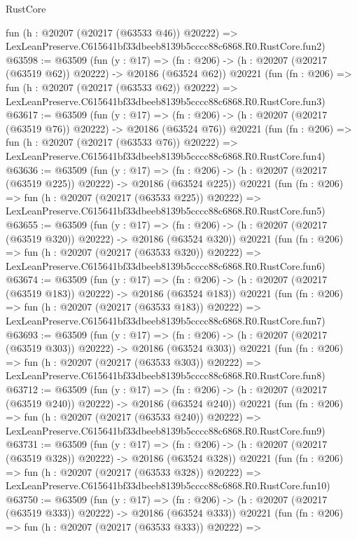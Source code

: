 \begin{lexlean}{RustCore}
\begin{coremodule}
    fun (h : @20207 (@20217 (@63533 @46)) @20222) =>
    LexLeanPreserve.C615641bf33dbeeb8139b5cccc88c6868.R0.RustCore.fun2)
@63598 := @63509
    (fun (y : @17) =>
    (fn : @206) -> (h : @20207 (@20217 (@63519 @62)) @20222) -> @20186 (@63524 @62))
    @20221
    (fun (fn : @206) =>
    fun (h : @20207 (@20217 (@63533 @62)) @20222) =>
    LexLeanPreserve.C615641bf33dbeeb8139b5cccc88c6868.R0.RustCore.fun3)
@63617 := @63509
    (fun (y : @17) =>
    (fn : @206) -> (h : @20207 (@20217 (@63519 @76)) @20222) -> @20186 (@63524 @76))
    @20221
    (fun (fn : @206) =>
    fun (h : @20207 (@20217 (@63533 @76)) @20222) =>
    LexLeanPreserve.C615641bf33dbeeb8139b5cccc88c6868.R0.RustCore.fun4)
@63636 := @63509
    (fun (y : @17) =>
    (fn : @206) -> (h : @20207 (@20217 (@63519 @225)) @20222) -> @20186 (@63524 @225))
    @20221
    (fun (fn : @206) =>
    fun (h : @20207 (@20217 (@63533 @225)) @20222) =>
    LexLeanPreserve.C615641bf33dbeeb8139b5cccc88c6868.R0.RustCore.fun5)
@63655 := @63509
    (fun (y : @17) =>
    (fn : @206) -> (h : @20207 (@20217 (@63519 @320)) @20222) -> @20186 (@63524 @320))
    @20221
    (fun (fn : @206) =>
    fun (h : @20207 (@20217 (@63533 @320)) @20222) =>
    LexLeanPreserve.C615641bf33dbeeb8139b5cccc88c6868.R0.RustCore.fun6)
@63674 := @63509
    (fun (y : @17) =>
    (fn : @206) -> (h : @20207 (@20217 (@63519 @183)) @20222) -> @20186 (@63524 @183))
    @20221
    (fun (fn : @206) =>
    fun (h : @20207 (@20217 (@63533 @183)) @20222) =>
    LexLeanPreserve.C615641bf33dbeeb8139b5cccc88c6868.R0.RustCore.fun7)
@63693 := @63509
    (fun (y : @17) =>
    (fn : @206) -> (h : @20207 (@20217 (@63519 @303)) @20222) -> @20186 (@63524 @303))
    @20221
    (fun (fn : @206) =>
    fun (h : @20207 (@20217 (@63533 @303)) @20222) =>
    LexLeanPreserve.C615641bf33dbeeb8139b5cccc88c6868.R0.RustCore.fun8)
@63712 := @63509
    (fun (y : @17) =>
    (fn : @206) -> (h : @20207 (@20217 (@63519 @240)) @20222) -> @20186 (@63524 @240))
    @20221
    (fun (fn : @206) =>
    fun (h : @20207 (@20217 (@63533 @240)) @20222) =>
    LexLeanPreserve.C615641bf33dbeeb8139b5cccc88c6868.R0.RustCore.fun9)
@63731 := @63509
    (fun (y : @17) =>
    (fn : @206) -> (h : @20207 (@20217 (@63519 @328)) @20222) -> @20186 (@63524 @328))
    @20221
    (fun (fn : @206) =>
    fun (h : @20207 (@20217 (@63533 @328)) @20222) =>
    LexLeanPreserve.C615641bf33dbeeb8139b5cccc88c6868.R0.RustCore.fun10)
@63750 := @63509
    (fun (y : @17) =>
    (fn : @206) -> (h : @20207 (@20217 (@63519 @333)) @20222) -> @20186 (@63524 @333))
    @20221
    (fun (fn : @206) =>
    fun (h : @20207 (@20217 (@63533 @333)) @20222) =>

\end{coremodule}
\end{lexlean}
